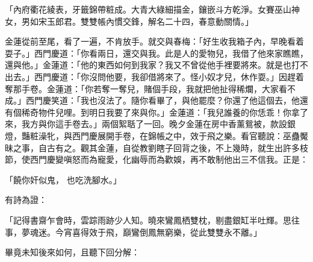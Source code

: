 \begin{showcontents}{}
「內府衢花綾表，牙籤錦帶粧成。大青大綠細描金，鑲嵌斗方乾淨。女賽巫山神女，男如宋玉郎君。雙雙帳內慣交鋒，解名二十四，春意動關情。」

金蓮從前至尾，看了一遍，不肯放手。就交與春梅：「好生收我箱子內，早晚看着耍子。」西門慶道：「你看兩日，還交與我。此是人的愛物兒，我借了他來家瞧瞧，還與他。」金蓮道：「他的東西如何到我家？我又不曾從他手裡要將來。就是也打不出去。」西門慶道：「你沒問他要，我卻借將來了。怪小奴才兒，休作耍。」因趕着奪那手卷。金蓮道：「你若奪一奪兒，賭個手段，我就把他扯得稀爛，大家看不成。」西門慶笑道：「我也沒法了。隨你看畢了，與他罷麼？你還了他這個去，他還有個稀奇物件兒哩。到明日我要了來與你。」金蓮道：「我兒誰養的你恁乖！你拿了來，我方與你這手卷去。」兩個絮聒了一回。晚夕金蓮在房中香薰鴛被，款設銀燈，豔粧澡牝，與西門慶展開手卷，在錦帳之中，效于飛之樂。看官聽說：巫蠱魘昧之事，自古有之。觀其金蓮，自從教劉瞎子回背之後，不上幾時，就生出許多枝節，使西門慶變嗔怒而為寵愛，化幽辱而為歡娛，再不敢制他出三不信我。正是：

「饒你奸似鬼，  也吃洗腳水。」

有詩為證：

「記得書齋乍會時，雲踪雨跡少人知。曉來鸞鳳栖雙枕，剔盡銀缸半吐輝。思往事，夢魂迷。今宵喜得效于飛，巔鸞倒鳳無窮樂，從此雙雙永不離。」

畢竟未知後來如何，且聽下回分解：





\end{showcontents}
